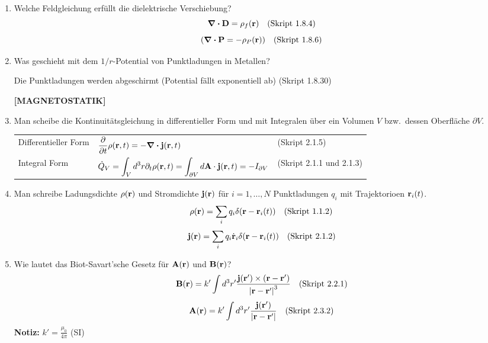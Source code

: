 \documentclass{scrartcl}
\newcommand{\rr}[1]{\frac{#1}{\abs{\vb{r}-\vb{r}'}}}
\newcommand{\ds}{\displaystyle}
\begin{document}
\begin{enumerate}
    \item Welche Feldgleichung erfüllt die dielektrische Verschiebung?
          $$\div \vb D=\rho_f(\vb r)\quad\text{(Skript 1.8.4)}$$
          $$\qty(\div \vb P=-\rho_P(\vb r))\quad\text{(Skript 1.8.6)}$$

    \item Was geschieht mit dem $1/r$-Potential von Punktladungen in
          Metallen?
          \begin{center}
            Die Punktladungen werden abgeschirmt (Potential fällt 
            exponentiell ab)
            (Skript 1.8.30)
          \end{center}

    \textbf{[MAGNETOSTATIK]}
    \item Man scheibe die Kontinuitätsgleichung in differentieller Form
          und mit Integralen über ein Volumen $V$ bzw.\ dessen Oberfläche 
          $\partial V$.
          \begin{center}
          \begin{tabular}{lll}
            Differentieller Form 
                              & $\ds\pdv{t}\rho(\vb r, t)=
                                 -\div\vb j(\vb r, t)$
                                & (Skript 2.1.5)\\
            Integral Form     & $\ds\dot Q_V
                                =\int_V d^3r\partial_t\rho(\vb r,t)=
                                \int_{\partial V}d\vb A\cdot
                                \vb j(\vb r, t)=-I_{\partial V}$
                                & (Skript 2.1.1 und 2.1.3)\\
          \end{tabular}
          \end{center}

    \item Man schreibe Ladungsdichte $\rho(\vb r)$ und Stromdichte
          $\vb j(\vb r)$ für $i=1,\ldots,N$ Punktladungen $q_i$ mit 
          Trajektorioen $\vb r_i(t)$.
          $$\rho(\vb r)=\sum_i q_i\delta(\vb r-\vb r_i(t))
          \quad \text{(Skript 1.1.2)}$$
          $$\vb j(\vb r)=\sum_i q_i\dot{\vb r}_i\delta(\vb r-\vb r_i(t))
          \quad \text{(Skript 2.1.2)}$$

    \item Wie lautet das Biot-Savart'sche Gesetz für $\vb A(\vb r)$ und
          $\vb B(\vb r)$?
          $$\vb B(\vb r)=k'\int d^3r'\frac{\vb j(\vb r')\times
          (\vb r-\vb r')}{\abs{\vb r-\vb r'}^3}
          \quad \text{(Skript 2.2.1)}$$
          $$\vb A(\vb r)=k'\int d^3r'\rr{\vb j(\vb r')}
          \quad \text{(Skript 2.3.2)}$$
          \textbf{Notiz:} $k'=\frac{\mu_0}{4\pi}$ (SI)


\end{enumerate}
\end{document}
